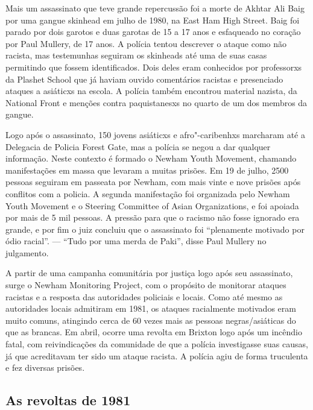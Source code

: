 Mais um assassinato que teve grande repercussão foi a morte de Akhtar Ali Baig por uma gangue skinhead em julho de 1980, na East Ham High Street. Baig foi parado por dois garotos e duas garotas de 15 a 17 anos e esfaqueado no coração por Paul Mullery, de 17 anos. A polícia tentou descrever o ataque como não racista, mas testemunhas seguiram os skinheads até uma de suas casas permitindo que fossem identificados. Dois deles eram conhecidos por professorxs da Plashet School que já haviam ouvido comentários racistas e presenciado ataques a asiáticxs na escola. A polícia também encontrou material nazista, da National Front e menções contra paquistanesxs no quarto de um dos membros da gangue.

Logo após o assassinato, 150 jovens asiáticxs e afro"-caribenhxs marcharam até a Delegacia de Policia Forest Gate, mas a polícia se negou a dar qualquer informação. Neste contexto é formado o Newham Youth Movement, chamando manifestações em massa que levaram a muitas prisões. Em 19 de julho, 2500 pessoas seguiram em passeata por Newham, com mais vinte e nove prisões após conflitos com a policia. A segunda manifestação foi organizada pelo Newham Youth Movement e o Steering Committee of Asian Organizations, e foi apoiada por mais de 5 mil pessoas. A pressão para que o racismo não fosse ignorado era grande, e por fim o juiz concluiu que o assassinato foi ``plenamente motivado por ódio racial''. --- ``Tudo por uma merda de Paki'', disse Paul Mullery no julgamento.

A partir de uma campanha comunitária por justiça logo após seu assassinato, surge o Newham Monitoring Project, com o propósito de monitorar ataques racistas e a resposta das autoridades policiais e locais. Como até mesmo as autoridades locais admitiram em 1981, os ataques racialmente motivados eram muito comuns, atingindo cerca de 60 vezes mais as pessoas negras/asiáticas do que as brancas. Em abril, ocorre uma revolta em Brixton logo após um incêndio fatal, com reivindicações da comunidade de que a polícia investigasse suas causas, já que acreditavam ter sido um ataque racista. A polícia agiu de forma truculenta e fez diversas prisões.


\subsection{As revoltas de 1981}

